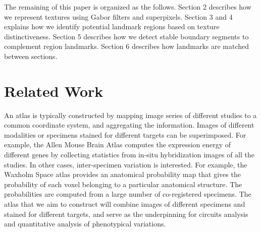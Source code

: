 \documentclass{llncs}
\begin{document}

The remaining of this paper is organized as the follows. Section 2 describes how we represent textures using Gabor filters and superpixels. Section 3 and 4 explains how we identify potential landmark regions based on texture distinctiveness. Section 5 describes how we detect stable boundary segments to complement region landmarks. Section 6 describes how landmarks are matched between sections.



\section{Related Work}

%

An atlas is typically constructed by mapping image series of different studies to a common coordinate system, and aggregating the information. 
Images of different modalities or specimens stained for different targets can be superimposed. For example, the Allen Mouse Brain Atlas\cite{lein2007genome} computes the expression energy of different genes by collecting statistics from in-situ hybridization images of all the studies. 
In other cases, inter-specimen variation is interested. For example, the Waxholm Space atlas\cite{lee2005standard} provides an anatomical probability map that gives the probability of each voxel belonging to a particular anatomical structure. The probabilities are computed from a large number of co-registered specimens. The atlas that we aim to construct will combine images of different specimens and stained for different targets, and serve as the underpinning for circuits analysis and quantitative analysis of phenotypical variations.
\end{document}
